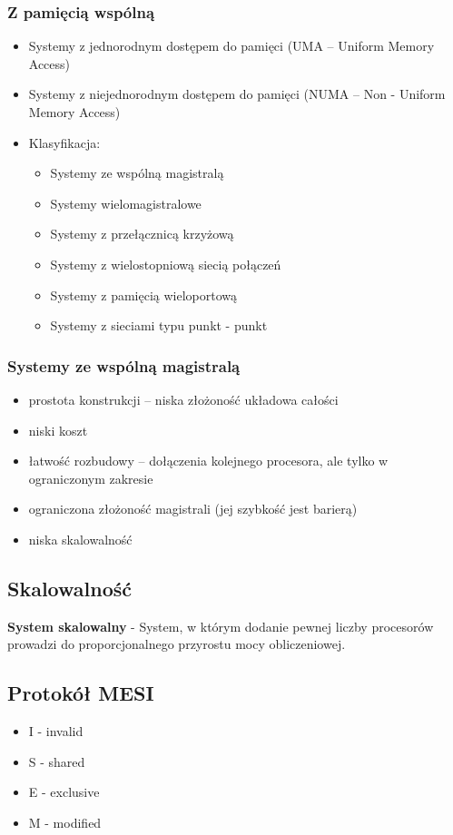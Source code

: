 \documentclass[a4paper,twoside]{article}
\begin{document}
		\subsubsection*{Z pamięcią wspólną}
		\begin{itemize}
			\item Systemy z jednorodnym dostępem do pamięci (UMA – Uniform Memory Access)
			\item Systemy z niejednorodnym dostępem do pamięci (NUMA – Non 	- Uniform Memory Access)
			\item Klasyfikacja:
			\begin{itemize}
				\item Systemy ze wspólną magistralą
				\item Systemy wielomagistralowe
				\item Systemy z przełącznicą krzyżową
				\item Systemy z wielostopniową siecią połączeń
				\item Systemy z pamięcią wieloportową
				\item Systemy z sieciami typu punkt - punkt
			\end{itemize}
		\end{itemize}
		\subsubsection*{Systemy ze wspólną magistralą}
		\begin{itemize}
			\item prostota konstrukcji – niska złożoność układowa całości
			\item niski koszt
			\item łatwość rozbudowy – dołączenia kolejnego procesora, ale tylko w ograniczonym zakresie
			\item ograniczona złożoność magistrali (jej szybkość jest barierą)
			\item niska skalowalność
		\end{itemize}
		\subsection*{Skalowalność}
		\textbf{System skalowalny} - System, w którym dodanie pewnej liczby procesorów prowadzi do proporcjonalnego przyrostu mocy obliczeniowej.
		\subsection*{Protokół MESI}
		\begin{itemize}
			\item I - invalid
			\item S - shared
			\item E - exclusive
			\item M - modified
		\end{itemize}
\end{document}
